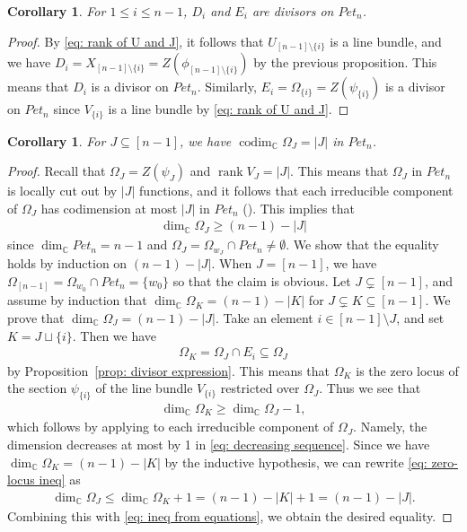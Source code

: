 \documentclass[11pt]{article}
\newtheorem{coro}[theo]{Corollary}
\theoremstyle{definition}
\numberwithin{equation}{section}
\numberwithin{equation}{section}
\DeclareMathOperator{\codim}{codim}
\DeclareMathOperator{\rank}{rank}
\begin{document}
\begin{coro}\label{cor: cartier}
For $1\le i\le n-1$, $D_i$ and $E_i$ are divisors on $Pet_{n}$.
\end{coro}

\begin{proof}
By \eqref{eq: rank of U and J}, it follows that $U_{[n-1]\setminus\{i\}}$ is a line bundle, and we have $D_i=X_{[n-1]\setminus\{i\}}=Z(\phi_{[n-1]\setminus\{i\}})$ by the previous proposition. This means that $D_i$ is a divisor on $Pet_{n}$. Similarly, $E_i=\Omega_{\{i\}}=Z(\psi_{\{i\}})$ is a divisor on $Pet_{n}$ since $V_{\{i\}}$ is a line bundle by \eqref{eq: rank of U and J}.
\end{proof}

\begin{coro}\label{cor: codim of OmegaJ}
For $J\subseteq[n-1]$, we have $\codim_{{\mathbb C}} \Omega_J=|J|$ in $Pet_{n}$.
\end{coro}

\begin{proof}
Recall that $\Omega_J =Z(\psi_J)$ and $\rank V_{J}=|J|$. This means that $\Omega_J$ in $Pet_{n}$ is locally cut out by $|J|$ functions, and it follows that each irreducible component of $\Omega_J$ has codimension at most $|J|$ in $Pet_{n}$ (\cite[Proposition 14.1]{Fulton}). This implies that
\begin{align}\label{eq: ineq from equations}
\dim_{{\mathbb C}}\Omega_J\ge (n-1)-|J|
\end{align}
since $\dim_{{\mathbb C}}Pet_{n}=n-1$ and $\Omega_J=\Omega_{w_J}\cap Pet_{n}\ne\emptyset$. We show that the equality holds by induction on $(n-1)-|J|$. When $J=[n-1]$, we have $\Omega_{[n-1]}=\Omega_{w_0}\cap Pet_{n}=\{w_0\}$ so that the claim is obvious. Let $J\subsetneq[n-1]$, and assume by induction that $\dim_{{\mathbb C}}\Omega_K= (n-1)-|K|$ for $J\subsetneq K\subseteq[n-1]$. We prove that $\dim_{{\mathbb C}}\Omega_J= (n-1)-|J|$. Take an element $i\in[n-1]\setminus J$, and set $K=J\sqcup\{i\}$. Then we have 
\begin{align}\label{eq: decreasing sequence}
\Omega_{K}=\Omega_J\cap E_i \subseteq \Omega_J
\end{align}
by Proposition~\ref{prop: divisor expression}. This means that $\Omega_{K}$ is the zero locus of the section $\psi_{\{i\}}$ of the line bundle $V_{\{i\}}$ restricted over $\Omega_{J}$. Thus we see that 
\begin{align}\label{eq: zero-locus ineq}
\dim_{{\mathbb C}}\Omega_{K} \ge \dim_{{\mathbb C}} \Omega_{J} -1,
\end{align}
which follows by applying \cite[Proposition 14.1]{Fulton} to each irreducible component of $\Omega_{J}$. Namely, the dimension decreases at most by 1 in \eqref{eq: decreasing sequence}. Since we have $\dim_{{\mathbb C}}\Omega_K= (n-1)-|K|$ by the inductive hypothesis, we can rewrite \eqref{eq: zero-locus ineq} as
\begin{align*}
\dim_{{\mathbb C}}\Omega_{J} \le \dim_{{\mathbb C}}\Omega_K +1 = (n-1) - |K| + 1 = (n-1) - |J|.
\end{align*}
Combining this with \eqref{eq: ineq from equations}, we obtain the desired equality.
\end{proof}
\end{document}
